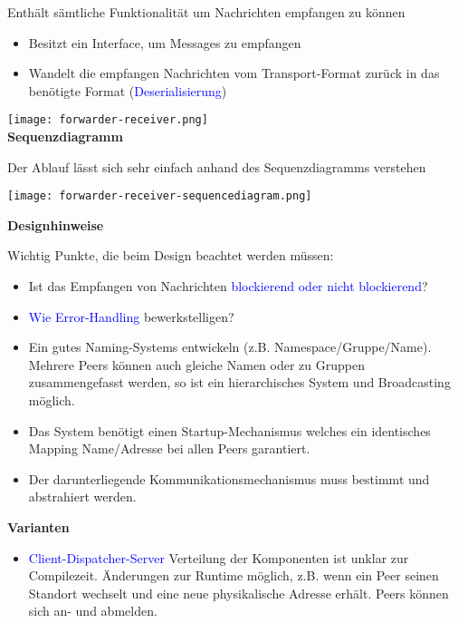 Enthält sämtliche Funktionalität um Nachrichten empfangen zu können

\begin{itemize}
    \item Besitzt ein Interface, um Messages zu empfangen
    \item Wandelt die empfangen Nachrichten vom Transport-Format zurück in das benötigte Format (\textcolor{blue}{Deserialisierung})
\end{itemize}

\texttt{[image: forwarder-receiver.png]} \\

\textbf{Sequenzdiagramm}

Der Ablauf lässt sich sehr einfach anhand des Sequenzdiagramms verstehen

\texttt{[image: forwarder-receiver-sequencediagram.png]}

\textbf{Designhinweise}

Wichtig Punkte, die beim Design beachtet werden müssen:

\begin{itemize}
    \item Ist das Empfangen von Nachrichten \textcolor{blue}{blockierend oder nicht blockierend}?
    \item \textcolor{blue}{Wie Error-Handling} bewerkstelligen?
    \item Ein gutes Naming-Systems entwickeln (z.B. Namespace/Gruppe/Name). Mehrere Peers können auch gleiche Namen oder zu Gruppen zusammengefasst werden, so ist ein hierarchisches System und Broadcasting möglich.
    \item Das System benötigt einen Startup-Mechanismus welches ein identisches Mapping Name/Adresse bei allen Peers garantiert.
    \item Der darunterliegende Kommunikationsmechanismus muss bestimmt und abstrahiert werden.
\end{itemize}
\vspace{10pt}
\textbf{Varianten}

\begin{itemize}
    \item \textcolor{blue}{Client-Dispatcher-Server} Verteilung der Komponenten ist unklar zur Compilezeit. Änderungen zur Runtime möglich, z.B. wenn ein Peer seinen Standort wechselt und eine neue physikalische Adresse erhält. Peers können sich an- und abmelden.
\end{itemize}

